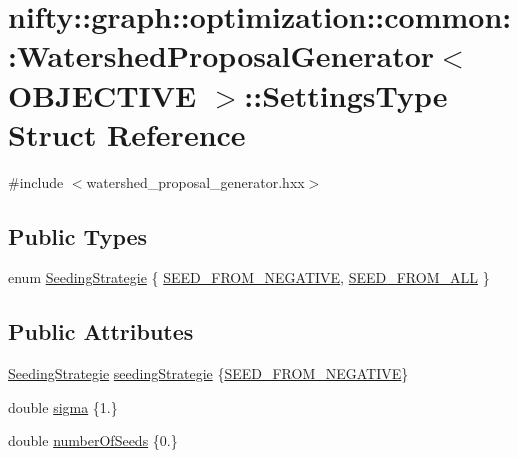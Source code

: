 \hypertarget{structnifty_1_1graph_1_1optimization_1_1common_1_1WatershedProposalGenerator_1_1SettingsType}{}\section{nifty\+:\+:graph\+:\+:optimization\+:\+:common\+:\+:Watershed\+Proposal\+Generator$<$ O\+B\+J\+E\+C\+T\+I\+V\+E $>$\+:\+:Settings\+Type Struct Reference}
\label{structnifty_1_1graph_1_1optimization_1_1common_1_1WatershedProposalGenerator_1_1SettingsType}


{\ttfamily \#include $<$watershed\+\_\+proposal\+\_\+generator.\+hxx$>$}

\subsection*{Public Types}
\begin{DoxyCompactItemize}
\item 
enum \hyperlink{structnifty_1_1graph_1_1optimization_1_1common_1_1WatershedProposalGenerator_1_1SettingsType_a84c0b4d1de8e24d987a774aee87c3e97}{Seeding\+Strategie} \{ \hyperlink{structnifty_1_1graph_1_1optimization_1_1common_1_1WatershedProposalGenerator_1_1SettingsType_a84c0b4d1de8e24d987a774aee87c3e97a126371099cd238765c4cc73c5e9d47ea}{S\+E\+E\+D\+\_\+\+F\+R\+O\+M\+\_\+\+N\+E\+G\+A\+T\+I\+V\+E}, 
\hyperlink{structnifty_1_1graph_1_1optimization_1_1common_1_1WatershedProposalGenerator_1_1SettingsType_a84c0b4d1de8e24d987a774aee87c3e97aba6a6fe4af4520194d8935ef727e1f0e}{S\+E\+E\+D\+\_\+\+F\+R\+O\+M\+\_\+\+A\+L\+L}
 \}
\end{DoxyCompactItemize}
\subsection*{Public Attributes}
\begin{DoxyCompactItemize}
\item 
\hyperlink{structnifty_1_1graph_1_1optimization_1_1common_1_1WatershedProposalGenerator_1_1SettingsType_a84c0b4d1de8e24d987a774aee87c3e97}{Seeding\+Strategie} \hyperlink{structnifty_1_1graph_1_1optimization_1_1common_1_1WatershedProposalGenerator_1_1SettingsType_a78297dece4f18a625b737244f96ed96c}{seeding\+Strategie} \{\hyperlink{structnifty_1_1graph_1_1optimization_1_1common_1_1WatershedProposalGenerator_1_1SettingsType_a84c0b4d1de8e24d987a774aee87c3e97a126371099cd238765c4cc73c5e9d47ea}{S\+E\+E\+D\+\_\+\+F\+R\+O\+M\+\_\+\+N\+E\+G\+A\+T\+I\+V\+E}\}
\item 
double \hyperlink{structnifty_1_1graph_1_1optimization_1_1common_1_1WatershedProposalGenerator_1_1SettingsType_a0b4d05d3a9ac297009811b4744c0d947}{sigma} \{1.\}
\item 
double \hyperlink{structnifty_1_1graph_1_1optimization_1_1common_1_1WatershedProposalGenerator_1_1SettingsType_a3338af8695481fe196d0790e7420431e}{number\+Of\+Seeds} \{0.\}
\end{DoxyCompactItemize}


